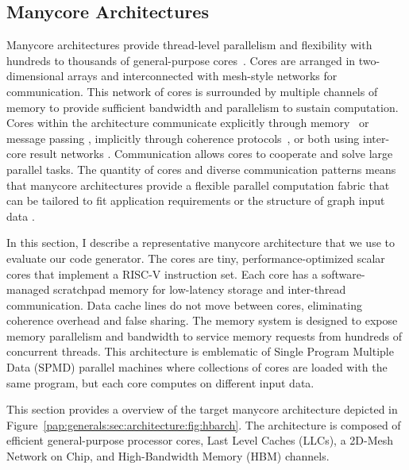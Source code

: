 
\subsection{Manycore Architectures} \label{pap:generals:sec:architecture}
Manycore architectures provide thread-level parallelism and flexibility with hundreds to thousands of general-purpose cores~\cite{ramey2011tilera, davidson2018celerity, gwennap2011adapteva, agathos2015parallela, taylor2004raw}.
Cores are arranged in two-dimensional arrays and interconnected with mesh-style networks for communication.
This network of cores is surrounded by multiple channels of memory to provide sufficient bandwidth and parallelism to sustain computation.
Cores within the architecture communicate explicitly through memory~\cite{davidson2018celerity} or message passing \cite{gwennap2011adapteva}, implicitly through coherence protocols~\cite{ramey2011tilera}, or both using inter-core result networks \cite{taylor2004raw}.
Communication allows cores to cooperate and solve large parallel tasks.
The quantity of cores and diverse communication patterns means that manycore architectures provide a flexible parallel computation fabric that can be tailored to fit application requirements or the structure of graph input data \cite{lumsdaine2007challenges}.

In this section, I describe a representative manycore architecture that we use to evaluate our code generator.
The cores are tiny, performance-optimized scalar cores that implement a RISC-V instruction set.
Each core has a software-managed scratchpad memory for low-latency storage and inter-thread communication.
Data cache lines do not move between cores, eliminating coherence overhead and false sharing.
The memory system is designed to expose memory parallelism and bandwidth to service memory requests from hundreds of concurrent threads.
This architecture is emblematic of Single Program Multiple Data (SPMD) parallel machines where collections of cores are loaded with the same program, but each core computes on different input data.

This section provides a overview of the target manycore
architecture depicted in
Figure~\ref{pap:generals:sec:architecture:fig:hbarch}. The
architecture is composed of efficient general-purpose processor cores,
Last Level Caches (LLCs), a 2D-Mesh Network on Chip, and High-Bandwidth
Memory (HBM) channels.


